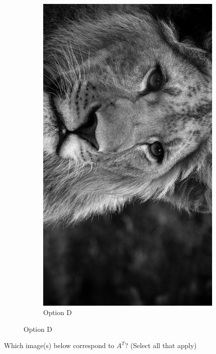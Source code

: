 \documentclass{ximera}
\begin{document}
\begin{problem}
\begin{figure}[h]
\begin{subfigure}[b]{0.35\textwidth}
      \includegraphics[width=\textwidth]{test_image_rot_3.jpg}
      \caption{Option D}
      \label{fig:optionD}
    \end{subfigure}
  \end{figure}
  
  Which image(s) below correspond to $A^T$? (Select all that apply)
  
  \begin{selectAll}
  
  

\end{selectAll}
\end{problem}
\end{document}
